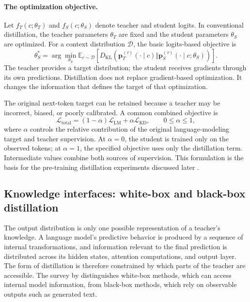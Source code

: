 \paragraph{The optimization objective.}
Let \(f_T(c;\theta_T)\) and \(f_S(c;\theta_S)\) denote teacher and
student logits.  In conventional distillation, the teacher parameters
\(\theta_T\) are fixed and the student parameters \(\theta_S\) are
optimized.  For a context distribution \(\mathcal D\), the basic
logits-based objective is
\begin{equation}
    \theta_S^*
    =\arg\min_{\theta_S}
    \mathbb E_{c\sim\mathcal D}
    \left[
      D_{\mathrm{KL}}\left(
      \mathbf p_T^{(\tau)}(\cdot\mid c)
      \Vert
      \mathbf p_S^{(\tau)}(\cdot\mid c;\theta_S)
      \right)
    \right].
    \label{eq:distillation-basic-objective}
\end{equation}
The teacher provides a target distribution; the student receives gradients
through its own predictions.  Distillation does not replace gradient-based
optimization.  It changes the information that defines the target of that
optimization.

The original next-token target can be retained because a teacher may be
incorrect, biased, or poorly calibrated.  A common combined objective is
\begin{equation}
    \mathcal L_{\mathrm{total}}
    =(1-\alpha)\mathcal L_{\mathrm{LM}}
    +\alpha\mathcal L_{\mathrm{KD}},
    \qquad 0\leq\alpha\leq 1,
    \label{eq:distillation-combined-objective}
\end{equation}
where \(\alpha\) controls the relative contribution of the original
language-modeling target and teacher supervision.  At \(\alpha=0\), the
student is trained only on the observed tokens; at \(\alpha=1\), the
specified objective uses only the distillation term.  Intermediate values
combine both sources of supervision.  This formulation is the basis for the
pre-training distillation experiments discussed later
\parencite{Peng2024PretrainingDistillation}.

\subsection{Knowledge interfaces: white-box and black-box distillation}
\label{subsec:distillation-knowledge-interfaces}

The output distribution is only one possible representation of a teacher's
knowledge.  A language model's predictive behavior is produced by a sequence
of internal transformations, and information relevant to the final prediction
is distributed across its hidden states, attention computations, and output
layer.  The form of distillation is therefore constrained by which parts of
the teacher are accessible.  The survey by \textcite{Yang2024SurveyKD}
distinguishes white-box methods, which can access internal model information,
from black-box methods, which rely on observable outputs such as generated
text.

